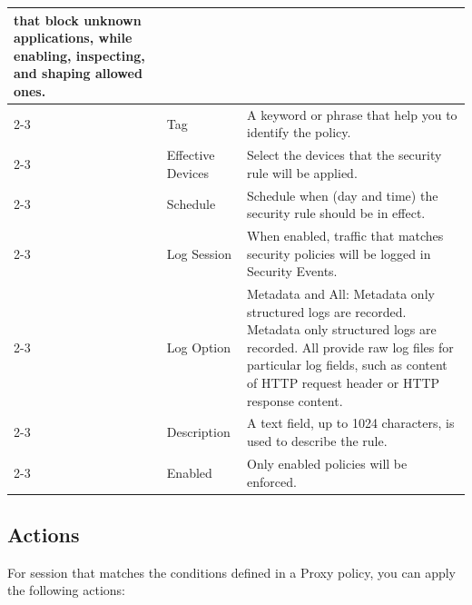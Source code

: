 \begin{longtable}{p{}|p{}|p{}}
                              that block unknown applications, while enabling, inspecting, and shaping allowed ones.\\ \cline{2-3}                                                                                                      
                              & Tag & A keyword or phrase that help you to identify the policy. \\ \cline{2-3}
                              & Effective Devices & Select the devices that the security rule will be applied.\\ \cline{2-3}
                              & Schedule & Schedule when (day and time) the security rule should be in effect. \\ \cline{2-3}
                              & Log Session & When enabled, traffic that matches security policies will be logged in Security Events. \\ \cline{2-3}
                              & Log Option &  Metadata and All: Metadata only structured logs are recorded. Metadata only structured logs are recorded. 
                              All provide raw log files for particular log fields, such as content of HTTP request header or HTTP response content.\\ \cline{2-3}
                              & Description & A text field, up to 1024 characters, is used to describe the rule. \\ \cline{2-3}
                              & Enabled & Only enabled policies will be enforced.\\ \hline                                                                                                 
\end{longtable}

\subsection*{\hypertarget{link:Proxy Actions}{Actions}}
\label{sec:policies:proxy:action}

For session that matches the conditions defined in a Proxy policy, you can apply the following actions: 


